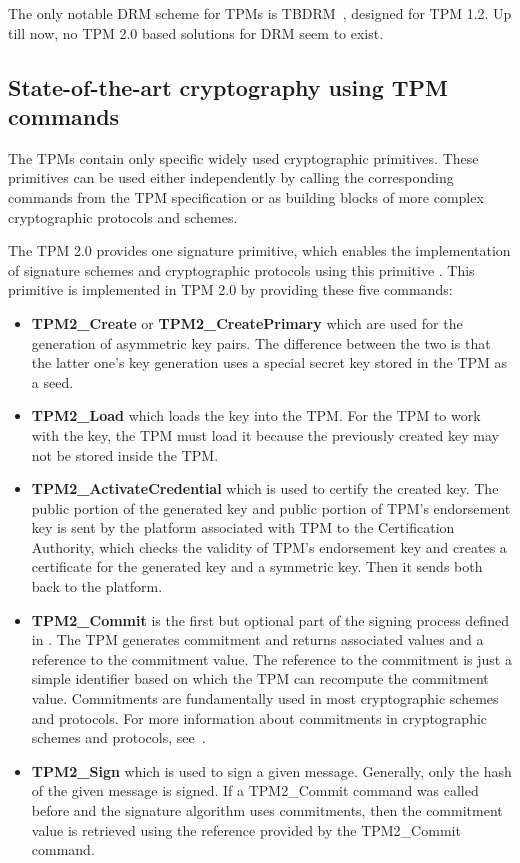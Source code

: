 The only notable DRM scheme for TPMs is TBDRM~\cite{yu2009tbdrm}, designed for TPM 1.2. Up till now, no TPM 2.0 based solutions for DRM seem to exist. 

\subsection{State-of-the-art cryptography using TPM commands}\label{sec:soacryptotpmcommands}
The TPMs contain only specific widely used cryptographic primitives. These primitives can be used either independently by calling the corresponding commands from the TPM specification or as building blocks of more complex cryptographic protocols and schemes. 

The TPM 2.0 provides one signature primitive, which enables the implementation of signature schemes and cryptographic protocols using this primitive \cite{chen2013flexible}. This primitive is implemented in TPM 2.0 by providing these five commands:
\begin{itemize}
    \item \textbf{TPM2\_Create} or \textbf{TPM2\_CreatePrimary} which are used for the generation of asymmetric key pairs. The difference between the two is that the latter one's key generation uses a special secret key stored in the TPM as a seed.
    \item \textbf{TPM2\_Load} which loads the key into the TPM. For the TPM to work with the key, the TPM must load it because the previously created key may not be stored inside the TPM.
    \item \textbf{TPM2\_ActivateCredential} which is used to certify the created key. The public portion of the generated key and public portion of TPM's endorsement key is sent by the platform associated with TPM to the Certification Authority, which checks the validity of TPM's endorsement key and creates a certificate for the generated key and a symmetric key. Then it sends both back to the platform.
    \item \textbf{TPM2\_Commit} is the first but optional part of the signing process defined in \cite{chen2013flexible}. The TPM generates commitment and returns associated values and a reference to the commitment value. The reference to the commitment is just a simple identifier based on which the TPM can recompute the commitment value. Commitments are fundamentally used in most cryptographic schemes and protocols. For more information about commitments in cryptographic schemes and protocols, see~\cite{damgaard1998commitment}. 
    \item \textbf{TPM2\_Sign} which is used to sign a given message. Generally, only the hash of the given message is signed. If a TPM2\_Commit command was called before and the signature algorithm uses commitments, then the commitment value is retrieved using the reference provided by the TPM2\_Commit command.
\end{itemize}

